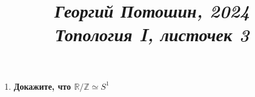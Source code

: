 \documentclass{article}
\title{
\textit{\small{Георгий Потошин, 2024}}\\
\vspace{0.3ex}
\textit{\huge{Топология I, листочек 3}}\vspace{1ex}
}
\date{\vspace{-10ex}}
\begin{document}
\maketitle

\begin{enumerate}
    \item \textbf{Докажите, что $\mathbb{R}/\mathbb{Z}\simeq S^1$} 
\end{enumerate}
\end{document}
